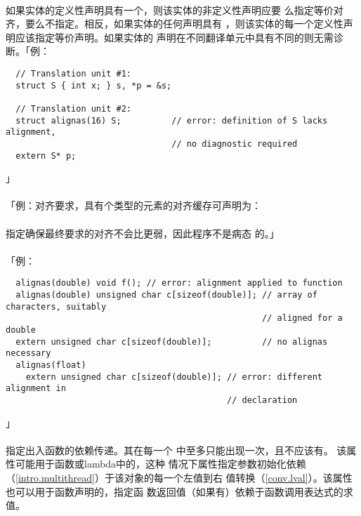 \paragraph{}
如果实体的定义性声明具有一个，则该实体的非定义性声明应要
么指定等价对齐，要么不指定。相反，如果实体的任何声明具有
，则该实体的每一个定义性声明应该指定等价声明。如果实体的
声明在不同翻译单元中具有不同的则无需诊断。「例：
\begin{lstlisting}
  // Translation unit #1:
  struct S { int x; } s, *p = &s;

  // Translation unit #2:
  struct alignas(16) S;          // error: definition of S lacks alignment,
                                 // no diagnostic required 
  extern S* p;
\end{lstlisting}」

\paragraph{}
「例：对齐要求，具有个类型的元素的对齐缓存可声明为：        \\
\mbox{\qquad {}}                         \\
指定确保最终要求的对齐不会比更弱，因此程序不是病态
的。」

\paragraph{}
「例：
\begin{lstlisting}
  alignas(double) void f(); // error: alignment applied to function
  alignas(double) unsigned char c[sizeof(double)]; // array of characters, suitably
                                                   // aligned for a double
  extern unsigned char c[sizeof(double)];          // no alignas necessary
  alignas(float)
    extern unsigned char c[sizeof(double)]; // error: different alignment in
                                            // declaration
\end{lstlisting}」

\paragraph{}
 指定出入函数的依赖传递。其在每一个
中至多只能出现一次，且不应该有。
该属性可能用于函数或lambda中的，这种
情况下属性指定参数初始化依赖（\ref{intro.multithread}）于该对象的每一个左值到右
值转换（\ref{conv.lval}）。该属性也可以用于函数声明的，指定函
数返回值（如果有）依赖于函数调用表达式的求值。

